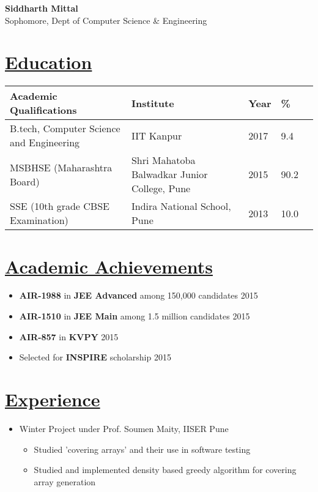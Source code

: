\documentclass{article}
\begin{document}
\begin{center}
{\noindent \LARGE\textbf{Siddharth Mittal}} \\
{Sophomore, Dept of Computer Science \& Engineering}
\end{center}

\section*{\underline{Education}}
\indent \begin{tabular}{| l @{\hskip 0.15in} | l @{\hskip 0.15in} | l @{\hskip 0.15in} | l @{\hskip 0.15in} | l }
\hline
\textbf{Academic Qualifications}  & \textbf{Institute} & \textbf{Year} & \textbf{\%} \\
\hline
B.tech, Computer Science and Engineering  & IIT Kanpur & 2017 & 9.4 \\
\hline
MSBHSE (Maharashtra Board) & Shri Mahatoba Balwadkar Junior College, Pune & 2015 & 90.2\\
\hline
SSE (10th grade CBSE Examination) & Indira National School, Pune & 2013 & 10.0 \\ 
\hline
\end{tabular}

\section*{\underline{Academic Achievements}}
\begin{itemize}
\item \noindent \textbf{AIR-1988} in \textbf{JEE Advanced} among 150,000 candidates \hfill{2015}
\item \textbf{AIR-1510} in \textbf{JEE Main} among 1.5 million candidates \hfill{2015}
\item \noindent \textbf{AIR-857} in \textbf{KVPY} \hfill{2015} 
\item \noindent Selected for \textbf{INSPIRE} scholarship \hfill {2015}
\end{itemize}

\section*{\underline{Experience}}
\begin{itemize}
\item Winter Project under Prof. Soumen Maity, IISER Pune
\begin{itemize}
\item \noindent Studied 'covering arrays' and their use in software testing
\item \noindent Studied and implemented density based greedy algorithm for covering array generation
\end{itemize}
\end{itemize}
\end{document}
